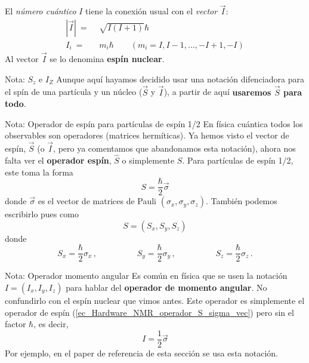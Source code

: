 \documentclass[a4paper,11pt]{book} %
\numberwithin{equation}{chapter}
\begin{document}
El \textit{número cuántico} $I$ tiene la conexión  usual con el \textit{vector} $\vec{I}$:
\begin{equation} 
\begin{aligned}
| \vec{I} | ~ = & ~\,  \sqrt{I(I+1)} \hbar \\
I_i ~ = & ~\, m_i \hbar \qquad (m_i = I, I-1, \dots, -I +1, -I)
\end{aligned}
\end{equation}
Al vector $\vec{I}$ se lo denomina \textbf{espín nuclear}.

	\begin{mybox_blue}{Nota: $S_z$ e $I_Z$}
	Aunque aquí hayamos decidido usar una notación difenciadora para el spín de una partícula 
	y un núcleo ($\vec{S}$ y $\vec{I}$), a partir de aquí \textbf{usaremos $\vec{S}$ para todo}.
	\end{mybox_blue}



	\begin{mybox_blue}{Nota: Operador de espín para partículas de espín 1/2}
	En física cuántica todos los observables son operadores (matrices hermíticas). Ya hemos visto 
	el vector de espín, $\vec{S}$ (o $\vec{I}$, pero ya comentamos que abandonamos esta notación),
	ahora nos falta ver el \textbf{operador espín},	$\hat{S}$ o simplemente $S$. Para partículas de 
	espín 1/2, este toma la forma
		\begin{equation} \label{ec_Hardware_NMR_operador_S_sigma_vec}
		\boxed{S = \frac{\hbar}{2} \vec{\sigma}}
		\end{equation}
	donde $\vec{\sigma}$ es el vector de matrices de Pauli $(\sigma_x, \sigma_y, \sigma_z)$.
	También podemos escribirlo pues como
		\begin{equation} \label{ec_Hardware_NMR_operador_S_vec_Sx-Sy-Sz}
		S = (S_x, S_y, S_z)
		\end{equation}
	donde 
		\begin{equation} \label{ec_Hardware_NMR_Sx-Sy-Sz}
		\boxed{S_x = \frac{\hbar}{2} \sigma_x} \, , \hspace{2cm} 
		\boxed{S_y = \frac{\hbar}{2} \sigma_y} \, , \hspace{2cm} 
		\boxed{S_z = \frac{\hbar}{2} \sigma_z} \, .
		\end{equation}
	\end{mybox_blue}
	
	\begin{mybox_blue}{Nota: Operador momento angular}
	Es común en física que se usen la notación $I = (I_x, I_y, I_z)$ para hablar del 
	\textbf{operador de momento angular}. No confundirlo con el espín nuclear que vimos
	antes. Este operador es simplemente el operador de espín (\ref{ec_Hardware_NMR_operador_S_sigma_vec})
	pero sin el factor $\hbar$, es decir,
		\begin{equation} 
		I = \frac{1}{2} \vec{\sigma}
		\end{equation}
	Por ejemplo, en el paper de referencia de esta sección \cite{bib_NMR_hardware} se usa esta notación. 
	\end{mybox_blue}
\end{document}
